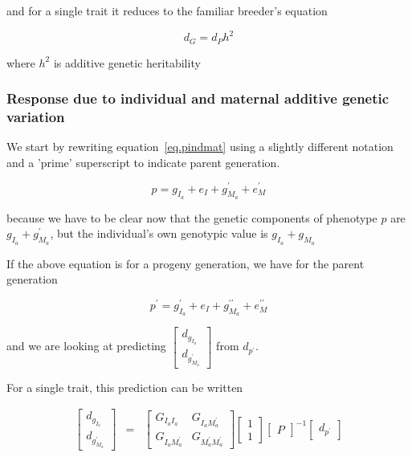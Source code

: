 \documentclass[titlepage]{article}  %
\begin{document}
and for a single trait it reduces to the familiar breeder's equation

\begin{displaymath}
d_{G} = d_{P} h^{2}
\end{displaymath}
 
where $h^{2}$ is additive genetic heritability

\subsubsection{Response due to individual and maternal additive genetic variation}
\label{sec.maternal}
We start by rewriting equation~\ref{eq.pindmat} using a slightly different notation and a 'prime' superscript to indicate parent generation.

\begin{equation}
p = g_{I_{a}} + e_{I} + g^{\prime}_{M_{a}} + e^{\prime}_{M}
\end{equation}

because we have to be clear now that the genetic components of phenotype $p$ are $g_{I_{a}} + g^{\prime}_{M_{a}}$, but the individual's own genotypic value is $g_{I_{a}} + g_{M_{a}}$

If the above equation is for a progeny generation, we have for the parent generation

\begin{equation}
p^{\prime} = g^{\prime}_{I_{a}} + e_{I} + g^{\prime\prime}_{M_{a}} + e^{\prime\prime}_{M}
\end{equation}

and we are looking at predicting $  \left[ \begin{array}{c}
 d_{g_{I_{a}}} \\
 d_{g^{\prime}_{M_{a}}}
\end{array} \right]
$ from $d_{p^{\prime}}$.

For a single trait, this prediction can be written

\begin{eqnarray*}
 \left[ \begin{array}{c}
 d_{g_{I_{a}}} \\
 d_{g^{\prime}_{M_{a}}}
\end{array} \right]
 & = &
 \left[ \begin{array}{cc}
 G_{I_{a}I_{a}} & G_{I_{a}M^{\prime}_{a}} \\ 
 G_{I_{a}M^{\prime}_{a}} & G_{M^{\prime}_{a}M^{\prime}_{a}}
\end{array} \right]
 \left[ \begin{array}{c}
 1 \\
 1
\end{array} \right]
\left[ \begin{array}{c}
 P
\end{array} \right] ^{-1}
 \left[ \begin{array}{c}
 d_{p^{\prime}}
\end{array} \right]
\end{eqnarray*}
\end{document}
